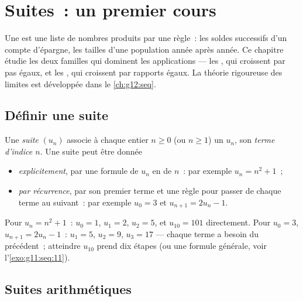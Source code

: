 \chapter{Suites~: un premier cours}\label{ch:g11:seq}

Une  est une liste de nombres produits par une règle~: les soldes
successifs d'un compte d'épargne, les tailles d'une population année
après année. Ce chapitre étudie les deux familles qui dominent les
applications --- les  \emph{}, qui croissent par pas
égaux, et les  \emph{}, qui croissent par rapports
égaux. La théorie rigoureuse des limites est développée dans le
\cref{ch:g12:seq}.

\section{Définir une suite}

\begin{definition}[Suite]\label{def:g11:seq:sequence}
Une \emph{suite} $(u_n)$ associe à chaque entier $n \geq 0$
(ou $n \geq 1$) un  $u_n$, son \emph{terme d'indice $n$}. Une
suite peut être donnée
\begin{itemize}
  \item \emph{explicitement}, par une formule de $u_n$ en  de
        $n$~: par exemple $u_n = n^2 + 1$~;
  \item \emph{par récurrence}, par son premier terme et une règle pour
        passer de chaque terme au suivant~: par exemple $u_0 = 3$ et
        $u_{n+1} = 2u_n - 1$.
\end{itemize}
\end{definition}

\begin{example}
Pour $u_n = n^2 + 1$~: $u_0 = 1$, $u_1 = 2$, $u_2 = 5$, et $u_{10} = 101$
directement. Pour $u_0 = 3$, $u_{n+1} = 2u_n - 1$~: $u_1 = 5$, $u_2 = 9$,
$u_3 = 17$ --- chaque terme a besoin du précédent~; atteindre $u_{10}$
prend dix étapes (ou une formule générale, voir
l'\cref{exo:g11:seq:11}).
\end{example}

\section{Suites arithmétiques}

